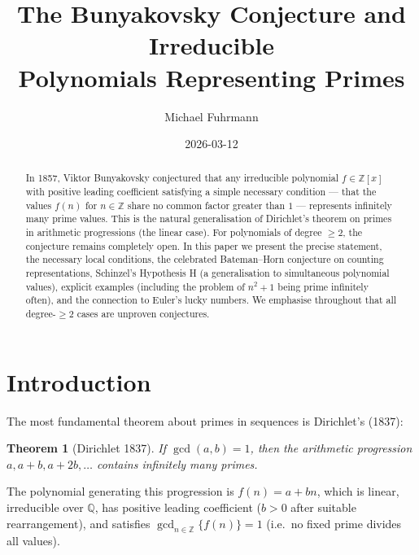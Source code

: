 \documentclass[12pt,a4paper]{amsart}
\newtheorem{theorem}{Theorem}[section]
\theoremstyle{definition}
\theoremstyle{remark}
\newcommand{\Z}{\mathbb{Z}}
\newcommand{\Q}{\mathbb{Q}}
\begin{document}
\title{The Bunyakovsky Conjecture and Irreducible\\
Polynomials Representing Primes}

\author{Michael Fuhrmann}
\address{Specialist Mathematics Project, Build 168}
\date{2026-03-12}

\begin{abstract}
In 1857, Viktor Bunyakovsky conjectured that any irreducible polynomial
$f \in \Z[x]$ with positive leading coefficient satisfying a simple
necessary condition --- that the values $f(n)$ for $n \in \Z$ share no
common factor greater than $1$ --- represents infinitely many prime values.
This is the natural generalisation of Dirichlet's theorem on primes in
arithmetic progressions (the linear case).
For polynomials of degree $\geq 2$, the conjecture remains completely open.
In this paper we present the precise statement, the necessary local conditions,
the celebrated Bateman--Horn conjecture on counting representations, Schinzel's
Hypothesis H (a generalisation to simultaneous polynomial values), explicit
examples (including the problem of $n^2 + 1$ being prime infinitely often),
and the connection to Euler's lucky numbers.
We emphasise throughout that all degree-$\geq 2$ cases are unproven conjectures.
\end{abstract}

\maketitle

\tableofcontents

\section{Introduction}

The most fundamental theorem about primes in sequences is Dirichlet's (1837):

\begin{theorem}[Dirichlet 1837]
If $\gcd(a, b) = 1$, then the arithmetic progression $a, a+b, a+2b, \ldots$
contains infinitely many primes.
\end{theorem}

The polynomial generating this progression is $f(n) = a + bn$, which is
linear, irreducible over $\Q$, has positive leading coefficient ($b > 0$
after suitable rearrangement), and satisfies $\gcd_{n \in \Z}\{f(n)\} = 1$
(i.e.\ no fixed prime divides all values).
\end{document}
